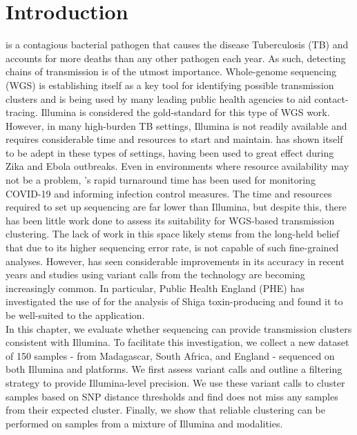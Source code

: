 
\section{Introduction}
\mtb{} is a contagious bacterial pathogen that causes the disease Tuberculosis (TB) and accounts for more deaths than any other pathogen each year. As such, detecting chains of \mtb{} transmission is of the utmost importance. Whole-genome sequencing (WGS) is establishing itself as a key tool for identifying possible transmission clusters and is being used by many leading public health agencies to aid contact-tracing. Illumina is considered the gold-standard for this type of WGS work. However, in many high-burden TB settings, Illumina is not readily available and requires considerable time and resources to start and maintain. \ont{} has shown itself to be adept in these types of settings, having been used to great effect during Zika and Ebola outbreaks. Even in environments where resource availability may not be a problem, \ont{}'s rapid turnaround time has been used for monitoring COVID-19 and informing infection control measures. The time and resources required to set up \ont{} sequencing are far lower than Illumina, but despite this, there has been little work done to assess its suitability for \mtb{} WGS-based transmission clustering. The lack of work in this space likely stems from the long-held belief that due to its higher sequencing error rate, \ont{} is not capable of such fine-grained analyses. However, \ont{} has seen considerable improvements in its accuracy in recent years and studies using variant calls from the technology are becoming increasingly common. In particular, Public Health England (PHE) has investigated the use of \ont{} for the analysis of Shiga toxin-producing \ecoli{} and found it to be well-suited to the application. \\
In this chapter, we evaluate whether \ont{} sequencing can provide \mtb{} transmission clusters consistent with Illumina. To facilitate this investigation, we collect a new dataset of 150 samples - from Madagascar, South Africa, and England - sequenced on both Illumina and \ont{} platforms. We first assess \ont{} variant calls and outline a filtering strategy to provide Illumina-level precision. We use these variant calls to cluster samples based on SNP distance thresholds and find \ont{} does not miss any samples from their expected cluster. Finally, we show that reliable clustering can be performed on samples from a mixture of Illumina and \ont{} modalities. \\
